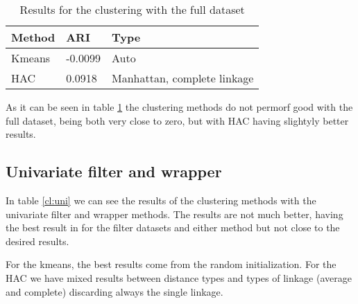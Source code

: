 \documentclass[a4paper,11pt]{article}
\begin{document}
\begin{table}
\centering
\begin{tabular}{|l|l|l|}
\hline

\textbf{Method} & \textbf{ARI} & \textbf{Type} \\ \hline
Kmeans & -0.0099 & Auto \\ \hline
HAC & 0.0918 & Manhattan, complete linkage \\ \hline

\end{tabular}
\caption{Results for the clustering with the full dataset}
\label{cl:full}
\end{table}

As it can be seen in table \ref{cl:full} the clustering methods do not permorf good with the full dataset, being both very close to zero, but with HAC having slightyly better results.

\subsection{Univariate filter and wrapper}

In table \ref{cl:uni} we can see the results of the clustering methods with the univariate filter and wrapper methods. The results are not much better, having the best result in for the filter datasets and either method but not close to the desired results.

For the kmeans, the best results come from the random initialization. For the HAC we have mixed results between distance types and types of linkage (average and complete) discarding always the single linkage.
\end{document}
